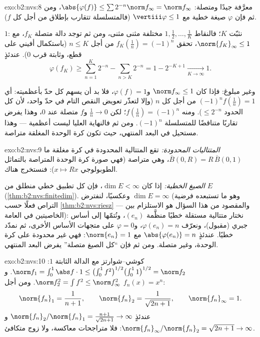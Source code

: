 \begin{solution}{exo:b2:nvs:8}
معرَّفة جيدًا ومتصلة: $\abs{\varphi(f)} \leq \sum 2^{-n}
\norm f_\infty = \norm f_\infty$، ومن ثم فإن $\varphi$ صيغة خطية
مع $\vertiii\varphi \leq 1$ (فالمتسلسلة تتقارب بإطلاق من أجل
كل $f$).

 $1$: نثبّت $K$؛ فالنقاط $1, \frac12, \dots, \frac1K$
مختلفة مثنى مثنى، ومن ثم توجد دالة متصلة $f_K$، مع $\norm{f_K}_\infty
\leq 1$، تحقق $f_K(\frac1n) = (-1)^n$ من أجل $n \leq K$ (باستكمال
أفيني على قطع، وثابتة قرب $0$). عندئذٍ
\[
\varphi(f_K) \geq \sum_{n=1}^{K} 2^{-n} - \sum_{n > K} 2^{-n}
= 1 - 2^{-K+1} \xrightarrow[K \to \infty]{} 1 .
\]

وغير مبلوغ: فإذا كان $\norm f_\infty \leq 1$ و$\varphi(f) = 1$، فلا بد أن يسهم كل
حدّ بأعظميته: أي $(-1)^n f(\frac1n) = 1$ من أجل كل
$n$ (وإلا لتعذّر تعويض النقص التام في حدّ واحد،
لأن كل الحدود $\leq 2^{-n}$). ومنه $f(\frac1n) = (-1)^n$؛ لكن
$\frac1n \to 0$ و$f$ متصلة عند $0$، وهذا يفرض
تقاربًا متناقضًا للمتسلسلة $(-1)^n$. ومن ثم فالنهاية العليا ليست
أعظمية --- وهذا مستحيل في البعد المنتهي، حيث تكون كرة
الوحدة المغلقة متراصة.
\end{solution}

\begin{solution}{exo:b2:nvs:9}
\emph{المتتاليات المحدودة:} تقع المتتالية المحدودة في كرة مغلقة
ما $\overline B(0, R) = R\,\overline B(0,1)$، وهي متراصة (فهي صورة
كرة الوحدة المتراصة بالتماثل الطوبولوجي $x \mapsto Rx$):
فنستخرج هناك.

\emph{الصيغ الخطية:} إذا كان $\dim E < \infty$، فإن كل تطبيق خطي منطلق من
$E$  (\cref{thm:b2:nvs:finitedim}). وعكسيًا،
لنفترض $\dim E = \infty$ (وهو ما تستبعده فرضية التراص فعلًا
حسب \cref{thm:b2:nvs:riesz} --- والمقصود من
هذا السؤال هو الاستلزام بين الخاصيتين في 
العامة): نختار متتالية مستقلة خطيًا منظَّمة
$(e_n)$، ونُتمّها إلى أساس جبري (مقبول)،
ونعرّف $\varphi(e_n) = n$، و$\varphi = 0$ على متجهات الأساس
الأخرى، ثم نمدّد خطيًا. عندئذٍ $\abs{\varphi(e_n)} = n$ مع
$\norm{e_n} = 1$: فهي غير محدودة على كرة الوحدة، وغير متصلة. ومن ثم
فإن ``كل الصيغ متصلة'' يفرض البعد المنتهي.
\end{solution}

\begin{solution}{exo:b2:nvs:10}
كوشي--شوارتز مع الدالة الثابتة $1$: $\norm f_1 =
\int_0^1 \abs f\cdot 1 \leq \bigl(\int_0^1
f^2\bigr)^{1/2}\bigl(\int_0^1 1\bigr)^{1/2} = \norm f_2$. و
$\norm f_2^2 = \int f^2 \leq \norm f_\infty^2$. ومن أجل $f_n(x) =
x^n$:
\[
\norm{f_n}_1 = \frac1{n+1}, \qquad
\norm{f_n}_2 = \frac1{\sqrt{2n+1}}, \qquad
\norm{f_n}_\infty = 1 .
\]
عندئذٍ $\norm{f_n}_2/\norm{f_n}_1 = \frac{n+1}{\sqrt{2n+1}} \to
\infty$ و$\norm{f_n}_\infty/\norm{f_n}_2 = \sqrt{2n+1} \to
\infty$: فلا متراجحات معاكسة، ولا زوج متكافئ.
\end{solution}

